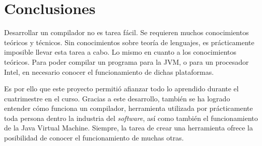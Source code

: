\documentclass[spanish]{article}
\begin{document}
    \section{Conclusiones}
    \par Desarrollar un compilador no es tarea fácil. Se requieren muchos conocimientos teóricos y técnicos. Sin conocimientos sobre teoría de lenguajes, es prácticamente imposible llevar esta tarea a cabo. Lo mismo en cuanto a los conocimientos teóricos. Para poder compilar un programa para la JVM, o para un procesador Intel, en necesario conocer el funcionamiento de dichas plataformas.
    \par Es por ello que este proyecto permitió afianzar todo lo aprendido durante el cuatrimestre en el curso. Gracias a este desarrollo, también se ha logrado entender cómo funciona un compilador, herramienta utilizada por prácticamente toda persona dentro la industria del \textit{software}, así como también el funcionamiento de la Java Virtual Machine. Siempre, la tarea de crear una herramienta ofrece la posibilidad de conocer el funcionamiento de muchas otras.
    \clearpage
\end{document}
